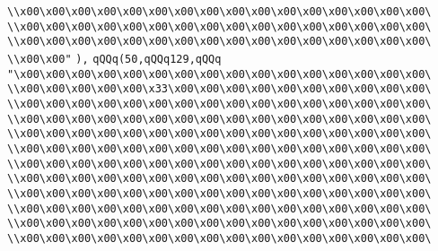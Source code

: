 \verb|\\x00\x00\x00\x00\x00\x00\x00\x00\x00\x00\x00\x00\x00\x00\x00\x00\|\newline
\verb|\\x00\x00\x00\x00\x00\x00\x00\x00\x00\x00\x00\x00\x00\x00\x00\x00\|\newline
\verb|\\x00\x00\x00\x00\x00\x00\x00\x00\x00\x00\x00\x00\x00\x00\x00\x00\|\newline
\verb|\\x00\x00"|\newline
\verb|),|\newline
\verb|qQQq(50,qQQq129,qQQq|\newline
\verb|"\x00\x00\x00\x00\x00\x00\x00\x00\x00\x00\x00\x00\x00\x00\x00\x00\|\newline
\verb|\\x00\x00\x00\x00\x00\x33\x00\x00\x00\x00\x00\x00\x00\x00\x00\x00\|\newline
\verb|\\x00\x00\x00\x00\x00\x00\x00\x00\x00\x00\x00\x00\x00\x00\x00\x00\|\newline
\verb|\\x00\x00\x00\x00\x00\x00\x00\x00\x00\x00\x00\x00\x00\x00\x00\x00\|\newline
\verb|\\x00\x00\x00\x00\x00\x00\x00\x00\x00\x00\x00\x00\x00\x00\x00\x00\|\newline
\verb|\\x00\x00\x00\x00\x00\x00\x00\x00\x00\x00\x00\x00\x00\x00\x00\x00\|\newline
\verb|\\x00\x00\x00\x00\x00\x00\x00\x00\x00\x00\x00\x00\x00\x00\x00\x00\|\newline
\verb|\\x00\x00\x00\x00\x00\x00\x00\x00\x00\x00\x00\x00\x00\x00\x00\x00\|\newline
\verb|\\x00\x00\x00\x00\x00\x00\x00\x00\x00\x00\x00\x00\x00\x00\x00\x00\|\newline
\verb|\\x00\x00\x00\x00\x00\x00\x00\x00\x00\x00\x00\x00\x00\x00\x00\x00\|\newline
\verb|\\x00\x00\x00\x00\x00\x00\x00\x00\x00\x00\x00\x00\x00\x00\x00\x00\|\newline
\verb|\\x00\x00\x00\x00\x00\x00\x00\x00\x00\x00\x00\x00\x00\x00\x00\x00\|\newline
